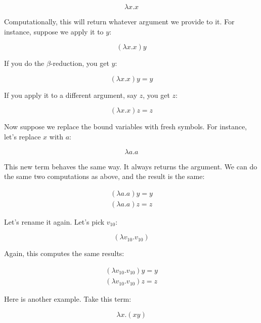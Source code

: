 \documentclass{book}
\numberwithin{equation}{chapter}
\begin{document}
\begin{equation}
\lambda x.x
\end{equation}

\noindent
Computationally, this will return whatever argument we provide to it. For instance, suppose we apply it to $y$:

\begin{equation}
(\lambda x.x) y  
\end{equation}

\noindent
If you do the $\beta$-reduction, you get $y$:

\begin{equation}
(\lambda x.x) y = y
\end{equation}

\noindent
If you apply it to a different argument, say $z$, you get $z$:

\begin{equation}
(\lambda x.x) z = z  
\end{equation}

\noindent
Now suppose we replace the bound variables with fresh symbols. For instance, let's replace $x$ with $a$:

\begin{equation}
\lambda a.a
\end{equation}

\noindent
This new term behaves the same way. It always returns the argument. We can do the same two computations as above, and the result is the same:

\begin{align}
(\lambda a.a) y = y \\  
(\lambda a.a) z = z
\end{align}

\noindent
Let's rename it again. Let's pick $v_{10}$:

\begin{equation}
(\lambda v_{10}.v_{10})
\end{equation}

\noindent
Again, this computes the same results:

\begin{align}
(\lambda v_{10}.v_{10}) y = y \\  
(\lambda v_{10}.v_{10}) z = z
\end{align}

\noindent
Here is another example. Take this term:

\begin{equation}
\lambda x.(x y)
\end{equation}
\end{document}
